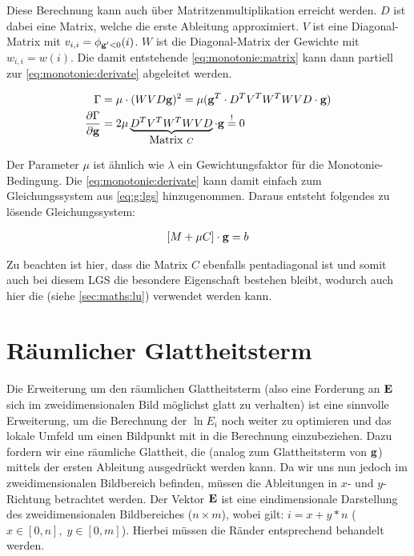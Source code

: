 Diese Berechnung kann auch über Matritzenmultiplikation erreicht werden. $D$ ist dabei eine Matrix, welche die erste Ableitung approximiert. $V$ ist eine Diagonal-Matrix mit $v_{i,i} = \phi_{\mathbf g'<0}(i)$. $W$ ist die Diagonal-Matrix der Gewichte mit $w_{i,i} = w(i)$. Die damit entstehende \autoref{eq:monotonie:matrix} kann dann partiell zur \autoref{eq:monotonie:derivate} abgeleitet werden.

\begin{align}
\label{eq:monotonie:matrix}
\Gamma &= \mu  \cdot (W V  D \mathbf g)^2 = \mu (\mathbf g^T \cdot D^T V^T W^T W V D \cdot \mathbf g)\\
\label{eq:monotonie:derivate}
\frac{\partial \Gamma}{\partial \mathbf g} &= 2 \mu \underbrace{D^T V^T W^T W V D}_{\mbox{Matrix }C}\cdot \mathbf g \overset{!}{=} 0
\end{align}


Der Parameter $\mu$ ist ähnlich wie $\lambda$ ein Gewichtungsfaktor für die Monotonie-Bedingung. Die \autoref{eq:monotonie:derivate} kann damit einfach zum Gleichungssystem aus \ref{eq:g:lgs} hinzugenommen. Daraus entsteht folgendes zu lösende Gleichungssystem:

\begin{align}
\label{eq:g:monotonie}
[M + \mu C] \cdot \mathbf g = b
\end{align}

Zu beachten ist hier, dass die Matrix $C$ ebenfalls pentadiagonal ist und somit auch bei diesem LGS die besondere Eigenschaft bestehen bleibt, wodurch auch hier die  (siehe \autoref{sec:maths:lu}) verwendet werden kann.


\section{Räumlicher Glattheitsterm}
\label{sec:raeumlich}
Die Erweiterung um den räumlichen Glattheitsterm (also eine Forderung an $\mathbf E$ sich im zweidimensionalen Bild möglichst glatt zu verhalten) ist eine sinnvolle Erweiterung, um die Berechnung der $\ln E_i$ noch weiter zu optimieren und das lokale Umfeld um einen Bildpunkt mit in die Berechnung einzubeziehen. Dazu fordern wir eine räumliche Glattheit, die (analog zum Glattheitsterm von $\mathbf g$) mittels der ersten Ableitung ausgedrückt werden kann. Da wir uns nun jedoch im zweidimensionalen Bildbereich befinden, müssen die Ableitungen in $x$- und $y$-Richtung betrachtet werden. Der Vektor $\mathbf E$ ist eine eindimensionale Darstellung des zweidimensionalen Bildbereiches ($n \times m$), wobei gilt: $i = x+y*n$ ($x \in [0,n], \; y \in [0,m]$). 
Hierbei müssen die Ränder entsprechend behandelt werden.

